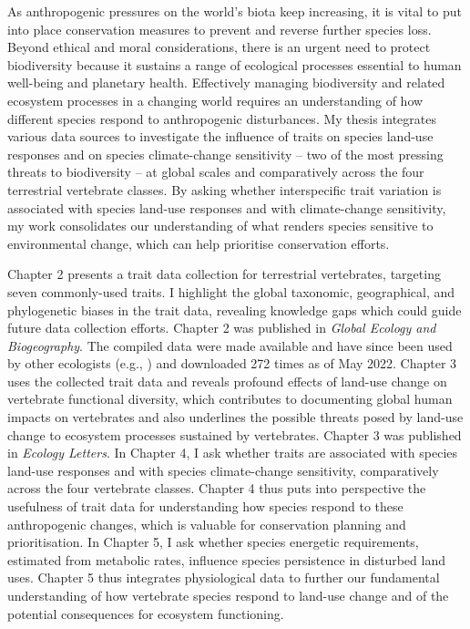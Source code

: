 As anthropogenic pressures on the world’s biota keep increasing, it is vital to put into place conservation measures to prevent and reverse further species loss. Beyond ethical and moral considerations, there is an urgent need to protect biodiversity because it sustains a range of ecological processes essential to human well-being and planetary health. Effectively managing biodiversity and related ecosystem processes in a changing world requires an understanding of how different species respond to anthropogenic disturbances. My thesis integrates various data sources to investigate the influence of traits on species land-use responses and on species climate-change sensitivity -- two of the most pressing threats to biodiversity -- at global scales and comparatively across the four terrestrial vertebrate classes. By asking whether interspecific trait variation is associated with species land-use responses and with climate-change sensitivity, my work consolidates our understanding of what renders species sensitive to environmental change, which can help prioritise conservation efforts. 
 
Chapter 2 presents a trait data collection for terrestrial vertebrates, targeting seven commonly-used traits. I highlight the global taxonomic, geographical, and phylogenetic biases in the trait data, revealing knowledge gaps which could guide future data collection efforts. Chapter 2 was published in \textit{Global Ecology and Biogeography}. The compiled data were made available and have since been used by other ecologists (e.g., \citet{Capdevila2022b}) and downloaded 272 times as of May 2022.  Chapter 3 uses the collected trait data and reveals profound effects of land-use change on vertebrate functional diversity, which contributes to documenting global human impacts on vertebrates and also underlines the possible threats posed by land-use change to ecosystem processes sustained by vertebrates. Chapter 3 was published in \textit{Ecology Letters}. In Chapter 4, I ask whether traits are associated with species land-use responses and with species climate-change sensitivity, comparatively across the four vertebrate classes. Chapter 4 thus puts into perspective the usefulness of trait data for understanding how species respond to these anthropogenic changes, which is valuable for conservation planning and prioritisation. In Chapter 5, I ask whether species energetic requirements, estimated from metabolic rates, influence species persistence in disturbed land uses. Chapter 5 thus integrates physiological data to further our fundamental understanding of how vertebrate species respond to land-use change and of the potential consequences for ecosystem functioning. 


